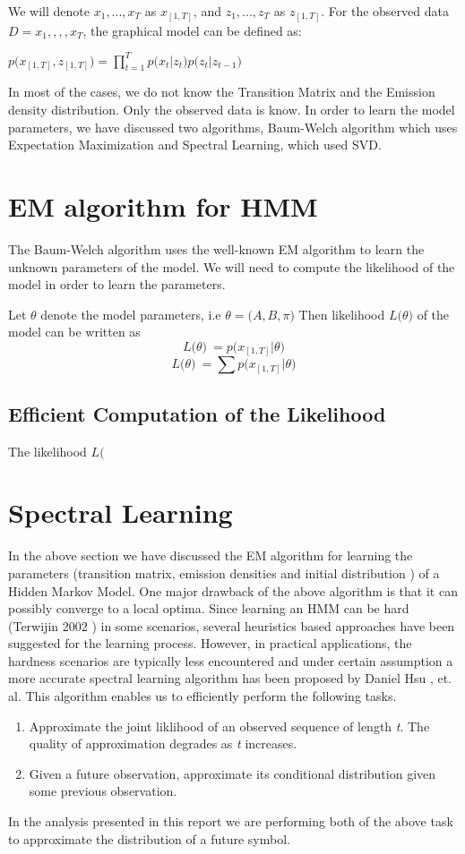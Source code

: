 \documentclass{article} %
\begin{document}
We will denote \(x_1,...,x_T\) as \(x_{[1,T]}\), and \(z_1,...,z_T\) as \(z_{[1,T]}\). For the observed data \(D ={x_1,,,,x_T}\), the graphical model can be defined as:

\begin{center} \(  p\big( x_{[1,T]}, z_{[1,T]} \big) = \prod_{t=1}^{T}p\big(x_t|z_t\big)p\big(z_t|z_{t-1}\big)  \)
\end{center}

In most of the cases, we do not know the Transition Matrix and the Emission density distribution. Only
the observed data is know. In order to learn the model parameters, we have discussed two algorithms,
Baum-Welch algorithm which uses Expectation Maximization and Spectral Learning, which used SVD.

\section{EM algorithm for HMM}
\label{EM algorithm}
The Baum-Welch algorithm uses the well-known EM algorithm to learn the unknown parameters of the model. We will need to compute the likelihood of the model in order to learn the parameters.

Let $\theta$ denote the model parameters, i.e \( \theta = \big(A,B,\pi\big) \)
Then likelihood \(L\big(\theta\big)\) of the model can be written as 
\[L\big(\theta \big)\ = p\big(x_{[1,T]}|\theta \big) \]
\[L\big(\theta \big)\ = \sum p\big(x_{[1,T]}|\theta \big) \]

\subsection{Efficient Computation of the Likelihood}
The likelihood \(L(\)

\section{Spectral Learning}
\label{Spectral Learning}

In the above section we have discussed the EM algorithm for learning the parameters (transition matrix, emission densities and initial distribution ) of a Hidden Markov Model. One major drawback of the above algorithm is that it can possibly converge to a local optima. Since learning an HMM can be hard (Terwijin 2002 ) in some scenarios, several heuristics based approaches have been suggested for the learning process. However, in practical applications, the hardness scenarios are typically less encountered and under certain assumption a more accurate spectral learning algorithm has been proposed by Daniel Hsu , et. al.  This algorithm enables us to efficiently perform the following tasks.
\begin{enumerate}
	\item Approximate the joint liklihood of an observed sequence of length \textit{t}. The quality of approximation degrades as \textit{t} increases.
	\item Given a future observation, approximate its conditional distribution given some previous observation. 
\end{enumerate}
In the analysis presented in this report we are performing both of the above task to approximate the distribution of a future symbol.
\end{document}
